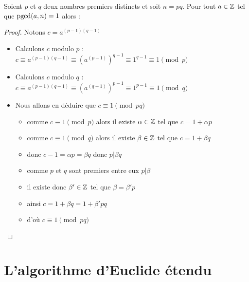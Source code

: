 \begin{frame}

\begin{theoreme}
Soient $p$ et $q$ deux nombres premiers distincts et soit $n = p q$. Pour tout
$a\in \mathbb{Z}$ tel que $\mathop{\text{pgcd}}\nolimits(a,n)=1$ alors :
\end{theoreme}


\begin{proof}
\pause
\vspace*{-1ex}
Notons $c = a^{(p-1)(q-1)}$
\begin{itemize}
\pause
  \item Calculons $c$ modulo $p$ :  $c \equiv a^{(p-1)(q-1)} \equiv (a^{(p-1)})^{q-1} \equiv 1^{q-1} \equiv 1 \pmod{p}$
\pause
  \item Calculons $c$ modulo $q$ :  $c \equiv a^{(p-1)(q-1)} \equiv (a^{(q-1)})^{p-1} \equiv 1^{p-1} \equiv 1 \pmod{q}$
\pause
  \item Nous allons en déduire que $c \equiv 1 \pmod{pq}$  
  \pause
  \begin{itemize}[<+->]
    \item comme $c \equiv 1 \pmod{p}$ alors il existe $\alpha \in \mathbb{Z}$ tel que $c = 1 + \alpha p$
    \item comme $c \equiv 1 \pmod{q}$ alors il existe $\beta \in \mathbb{Z}$ tel que $c = 1 + \beta q$
    \item donc $c-1 = \alpha p = \beta q$ donc $p | \beta q$
    \item comme $p$ et $q$ sont premiers entre eux $p | \beta$
    \item il existe donc $\beta'\in \mathbb{Z}$ tel que $\beta = \beta' p $
    \item ainsi $c = 1 + \beta q = 1 + \beta' pq$
    \item d'où $c \equiv 1 \pmod{pq}$ \qedhere
  \end{itemize}
  
\end{itemize}
\vspace*{-1ex}
\end{proof}
 
\end{frame}



\section{L'algorithme d'Euclide étendu}

